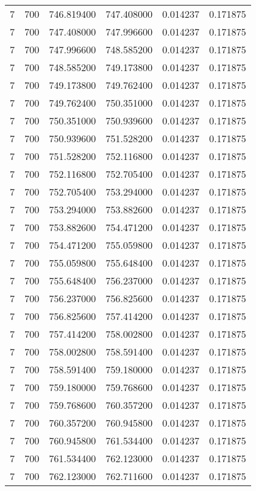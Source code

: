 \begin{longtable}{rrrrrr}
7 & 700 & 746.819400 & 747.408000 & 0.014237 & 0.171875 \\
7 & 700 & 747.408000 & 747.996600 & 0.014237 & 0.171875 \\
7 & 700 & 747.996600 & 748.585200 & 0.014237 & 0.171875 \\
7 & 700 & 748.585200 & 749.173800 & 0.014237 & 0.171875 \\
7 & 700 & 749.173800 & 749.762400 & 0.014237 & 0.171875 \\
7 & 700 & 749.762400 & 750.351000 & 0.014237 & 0.171875 \\
7 & 700 & 750.351000 & 750.939600 & 0.014237 & 0.171875 \\
7 & 700 & 750.939600 & 751.528200 & 0.014237 & 0.171875 \\
7 & 700 & 751.528200 & 752.116800 & 0.014237 & 0.171875 \\
7 & 700 & 752.116800 & 752.705400 & 0.014237 & 0.171875 \\
7 & 700 & 752.705400 & 753.294000 & 0.014237 & 0.171875 \\
7 & 700 & 753.294000 & 753.882600 & 0.014237 & 0.171875 \\
7 & 700 & 753.882600 & 754.471200 & 0.014237 & 0.171875 \\
7 & 700 & 754.471200 & 755.059800 & 0.014237 & 0.171875 \\
7 & 700 & 755.059800 & 755.648400 & 0.014237 & 0.171875 \\
7 & 700 & 755.648400 & 756.237000 & 0.014237 & 0.171875 \\
7 & 700 & 756.237000 & 756.825600 & 0.014237 & 0.171875 \\
7 & 700 & 756.825600 & 757.414200 & 0.014237 & 0.171875 \\
7 & 700 & 757.414200 & 758.002800 & 0.014237 & 0.171875 \\
7 & 700 & 758.002800 & 758.591400 & 0.014237 & 0.171875 \\
7 & 700 & 758.591400 & 759.180000 & 0.014237 & 0.171875 \\
7 & 700 & 759.180000 & 759.768600 & 0.014237 & 0.171875 \\
7 & 700 & 759.768600 & 760.357200 & 0.014237 & 0.171875 \\
7 & 700 & 760.357200 & 760.945800 & 0.014237 & 0.171875 \\
7 & 700 & 760.945800 & 761.534400 & 0.014237 & 0.171875 \\
7 & 700 & 761.534400 & 762.123000 & 0.014237 & 0.171875 \\
7 & 700 & 762.123000 & 762.711600 & 0.014237 & 0.171875 \\

\end{longtable}
